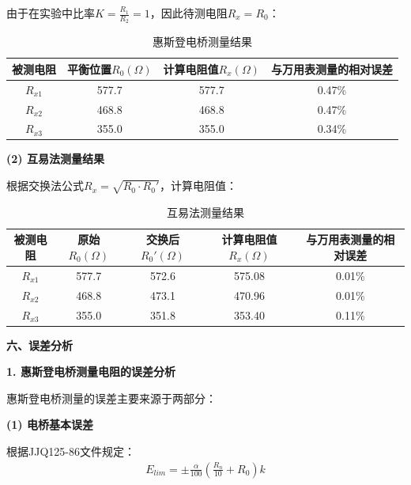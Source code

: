 ﻿\documentclass[12pt,a4paper]{article}
\begin{document}
由于在实验中比率$K = \frac{R_1}{R_2} = 1$，因此待测电阻$R_x = R_0$：

\begin{table}[H]
    \centering
    \begin{tabular}{|c|c|c|c|}
        \hline
        被测电阻 & 平衡位置$R_0 (\Omega)$ & 计算电阻值$R_x (\Omega)$ & 与万用表测量的相对误差 \\
        \hline
        $R_{x1}$ & 577.7 & 577.7 & 0.47\% \\ %
        \hline
        $R_{x2}$ & 468.8 & 468.8 & 0.47\% \\
        \hline
        $R_{x3}$ & 355.0 & 355.0 & 0.34\% \\
        \hline
    \end{tabular}
    \caption{惠斯登电桥测量结果}
    \label{tab:wheatstone_result}
\end{table}

\textbf{(2) 互易法测量结果}

根据交换法公式$R_x = \sqrt{R_0 \cdot R_0'}$，计算电阻值：

\begin{table}[H]
    \centering
    \begin{tabular}{|c|c|c|c|c|}
        \hline
        被测电阻 & 原始$R_0 (\Omega)$ & 交换后$R_0' (\Omega)$ & 计算电阻值$R_x (\Omega)$ & 与万用表测量的相对误差 \\
        \hline
        $R_{x1}$ & 577.7 & 572.6 & 575.08 & 0.01\% \\ %
        \hline
        $R_{x2}$ & 468.8 & 473.1 & 470.96 & 0.01\% \\ %
        \hline
        $R_{x3}$ & 355.0 & 351.8 & 353.40 & 0.11\% \\ %
        \hline
    \end{tabular}
    \caption{互易法测量结果}
    \label{tab:interchange_result}
\end{table}

\textbf{六、误差分析}

\textbf{1. 惠斯登电桥测量电阻的误差分析}

惠斯登电桥测量的误差主要来源于两部分：

\textbf{(1) 电桥基本误差}

根据JJQ125-86文件规定：
\begin{align}
    E_{lim} = \pm\frac{\alpha}{100}\left(\frac{R_n}{10} + R_0\right)k
\end{align}
\end{document}
